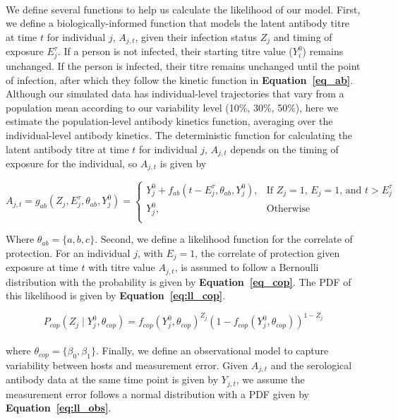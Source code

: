 \paragraph{}We define several functions to help us calculate the likelihood of our model. First, we define a biologically-informed function that models the latent antibody titre at time $t$ for individual $j$, $A_{j,t}$, given their infection status $Z_j$ and timing of exposure $E_j^\tau$. If a person is not infected, their starting titre value ($Y^0_i$) remains unchanged. If the person is infected, their titre remains unchanged until the point of infection, after which they follow the kinetic function in \textbf{Equation~\ref{eq_ab}}. Although our simulated data has individual-level trajectories that vary from a population mean according to our variability level (10\%, 30\%, 50\%), here we estimate the population-level antibody kinetics function, averaging over the individual-level antibody kinetics. The deterministic function for calculating the latent antibody titre at time $t$ for individual $j$, $A_{j,t}$ depends on the timing of exposure for the individual, so $A_{j,t}$ is given by

\begin{equation}
\label{eq:ll_abkin}
A_{j,t}  = g_{ab}( Z_j,  E_j^\tau, \theta_{ab}, Y^0_j) = 
	\begin{cases}
	Y^0_j + f_{ab}(t - E_j^\tau, \theta_{ab}, Y^0_j),  & \text{If $Z_j = 1$, $E_j = 1$, and $t > E_j^\tau$} \\
	Y^0_j, & \text{Otherwise} \\ 
	\end{cases}
\end{equation}

Where $\theta_{ab} = \{a, b, c\}$. Second, we define a likelihood function for the correlate of protection. For an individual $j$, with $E_j = 1$, the correlate of protection given exposure at time $t$ with titre value $A_{j, t}$, is assumed to follow a Bernoulli distribution with the probability is given by \textbf{Equation~\ref{eq_cop}}. The PDF of this likelihood is given by \textbf{Equation~\ref{eq:ll_cop}}.

\begin{equation}
\label{eq:ll_cop}
P_{cop}(Z_j \mid Y_{j}^0, \theta_{cop} ) =  f_{cop}(Y_{j}^0,  \theta_{cop})^{Z_j}(1- f_{cop}(Y_{j}^0,  \theta_{cop} ))^{1-Z_j}
\end{equation}

\paragraph{}where $\theta_{cop} = \{\beta_0, \beta_1\}$. Finally, we define an observational model to capture variability between hosts and measurement error. Given $A_{j,t}$ and the serological antibody data at the same time point is given by $Y_{j, t}$, we assume the measurement error follows a normal distribution with a PDF given by \textbf{Equation~\ref{eq:ll_obs}}.

